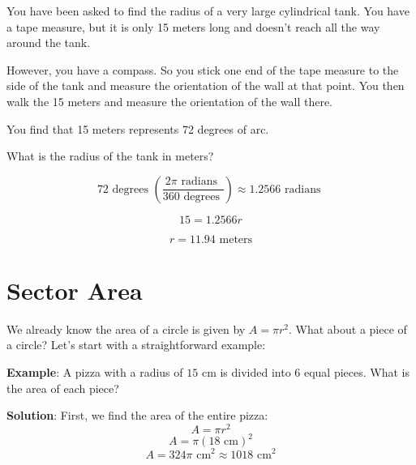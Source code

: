\begin{Exercise}[title={Arc Length}, label=arc_length]

You have been asked to find the radius of a very large cylindrical tank.
You have a tape measure, but it is only 15 meters long and doesn't
reach all the way around the tank.

However, you have a compass.  So you stick one end of the tape measure
to the side of the tank and measure the orientation of the wall at
that point. You then walk the 15 meters and measure the orientation of the 
wall there.

You find that 15 meters represents 72 degrees of arc.

What is the radius of the tank in meters?
  
\end{Exercise}
\begin{Answer}[ref=arc_length]

  $$72 \text{ degrees } \left(\frac{2\pi \text{ radians }}{360 \text{ degrees }
  }\right) \approx 1.2566 \text{ radians }$$

  $$15 = 1.2566r$$

  $$r = 11.94 \text{ meters}$$
  
\end{Answer}

\section{Sector Area}
We already know the area of a circle is given by $A = \pi r^2$. What about a 
piece of a circle? Let's start with a straightforward example:

\textbf{Example}: A pizza with a radius of $15$ cm is divided into 6 equal 
pieces. What is the area of each piece?

\textbf{Solution}: First, we find the area of the entire pizza:
$$A = \pi r^2$$
$$A = \pi (18\text{ cm})^2$$
$$A = 324\pi\text{ cm}^2 \approx 1018\text{ cm}^2$$

